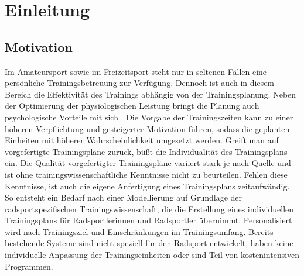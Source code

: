 \chapter{Einleitung}
\label{sec:einleitung}
\section{Motivation}
Im Amateursport sowie im Freizeitsport steht nur in seltenen Fällen eine persönliche Trainingsbetreuung zur Verfügung. Dennoch ist auch in diesem Bereich die Effektivität des Trainings abhängig von der Trainingsplanung. Neben der Optimierung der physiologischen Leistung bringt die Planung auch psychologische Vorteile mit sich \cite{ImplementationIntentions}. Die Vorgabe der Trainingszeiten kann zu einer höheren Verpflichtung und gesteigerter Motivation führen, sodass die geplanten Einheiten mit höherer Wahrscheinlichkeit umgesetzt werden.
Greift man auf vorgefertigte Trainingspläne zurück, büßt die Individualität des Trainingsplans ein.  Die Qualität vorgefertigter Trainingspläne variiert stark je nach Quelle und ist ohne trainingswissenschaftliche Kenntnisse nicht zu beurteilen. Fehlen diese Kenntnisse, ist auch die eigene Anfertigung eines Trainingsplans zeitaufwändig. 
So entsteht ein Bedarf nach einer Modellierung auf Grundlage der radsportspezifischen Trainingswissenschaft, die die Erstellung eines individuellen Trainingsplans für Radsportlerinnen und Radsportler übernimmt. Personalisiert wird nach Trainingsziel und Einschränkungen im Trainingsumfang. 
Bereits bestehende Systeme sind nicht speziell für den Radsport entwickelt, haben keine individuelle Anpassung der Trainingseinheiten oder sind Teil von kostenintensiven Programmen.

